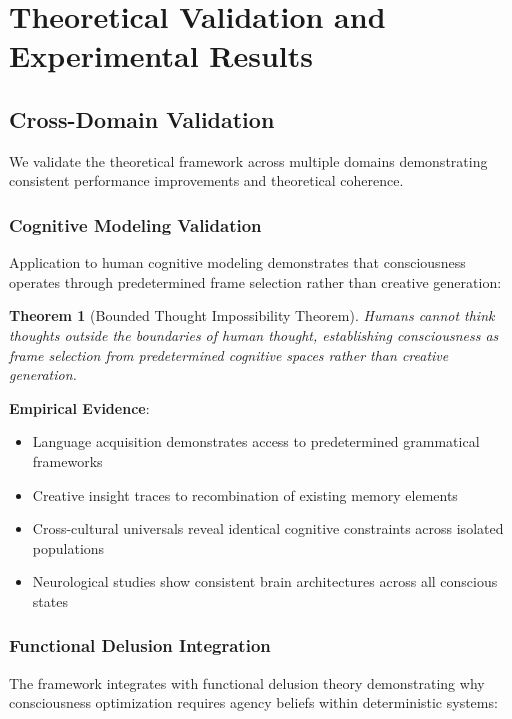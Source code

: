 \documentclass[12pt,a4paper]{article}
\newtheorem{theorem}{Theorem}
\begin{document}
\section{Theoretical Validation and Experimental Results}

\subsection{Cross-Domain Validation}

We validate the theoretical framework across multiple domains demonstrating consistent performance improvements and theoretical coherence.

\subsubsection{Cognitive Modeling Validation}

Application to human cognitive modeling demonstrates that consciousness operates through predetermined frame selection rather than creative generation:

\begin{theorem}[Bounded Thought Impossibility Theorem]
Humans cannot think thoughts outside the boundaries of human thought, establishing consciousness as frame selection from predetermined cognitive spaces rather than creative generation.
\end{theorem}

\textbf{Empirical Evidence}:
\begin{itemize}
\item Language acquisition demonstrates access to predetermined grammatical frameworks
\item Creative insight traces to recombination of existing memory elements  
\item Cross-cultural universals reveal identical cognitive constraints across isolated populations
\item Neurological studies show consistent brain architectures across all conscious states
\end{itemize}

\subsubsection{Functional Delusion Integration}

The framework integrates with functional delusion theory demonstrating why consciousness optimization requires agency beliefs within deterministic systems:
\end{document}
